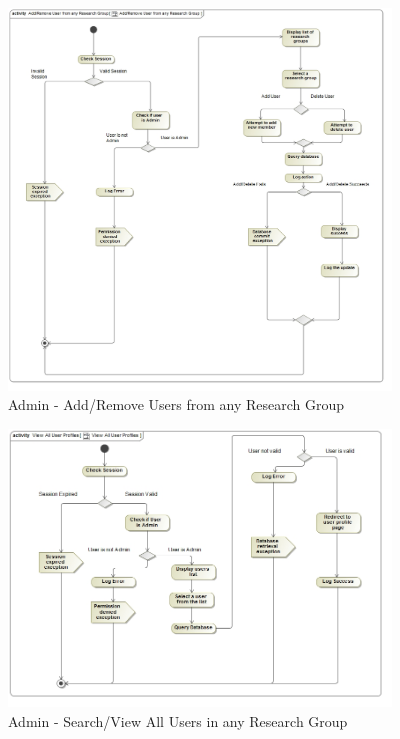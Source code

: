 \documentclass{article}
\begin{document}
			\begin{figure}[H]
				\includegraphics[width=4in, center]{../Diagrams/Process Specifications/User subsystem/Add_Remove User from any Research Group.jpg}
				\caption{Admin - Add/Remove Users from any Research Group}
			\end{figure}
			\begin{figure}[H]
				\includegraphics[width=4in, center]{../Diagrams/Process Specifications/User subsystem/View All User Profiles.jpg}
				\caption{Admin - Search/View All Users in any Research Group}
			\end{figure}
			
\end{document}
